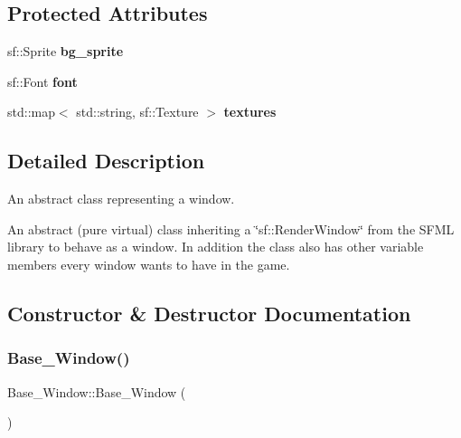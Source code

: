 \subsection*{Protected Attributes}
\begin{DoxyCompactItemize}
\item 
\mbox{\label{classBase__Window_aaf143aef62737103510092d9eda06118}} 
sf\+::\+Sprite {\bfseries bg\+\_\+sprite}
\item 
\mbox{\label{classBase__Window_a95819b9928fd4943c0478e2f9baa3842}} 
sf\+::\+Font {\bfseries font}
\item 
\mbox{\label{classBase__Window_a0063751d92040019a7086dfc39808274}} 
std\+::map$<$ std\+::string, sf\+::\+Texture $>$ {\bfseries textures}
\end{DoxyCompactItemize}


\subsection{Detailed Description}
An abstract class representing a window. 

An abstract (pure virtual) class inheriting a \char`\"{}sf\+::\+Render\+Window\char`\"{} from the S\+F\+ML library to behave as a window. In addition the class also has other variable members every window wants to have in the game. 

\subsection{Constructor \& Destructor Documentation}
\mbox{\label{classBase__Window_a89fc36aacdebe0a28371648c16a51be6}} 
\subsubsection{\texorpdfstring{Base\+\_\+\+Window()}{Base\_Window()}}
{\footnotesize\ttfamily Base\+\_\+\+Window\+::\+Base\+\_\+\+Window (\begin{DoxyParamCaption}{ }\end{DoxyParamCaption})\hspace{0.3cm}{\ttfamily [default]}}



